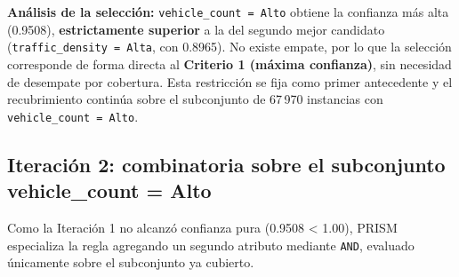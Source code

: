 \documentclass[12pt,a4paper]{article}
\begin{document}
\textbf{Análisis de la selección:} \texttt{vehicle\_count = Alto} obtiene
la confianza más alta (0.9508), \textbf{estrictamente superior} a la del
segundo mejor candidato (\texttt{traffic\_density = Alta}, con 0.8965).
No existe empate, por lo que la selección corresponde de forma directa al
\textbf{Criterio 1 (máxima confianza)}, sin necesidad de desempate por
cobertura. Esta restricción se fija como primer antecedente y el
recubrimiento continúa sobre el subconjunto de 67\,970 instancias con
\texttt{vehicle\_count = Alto}.

\subsection{Iteración 2: combinatoria sobre el subconjunto vehicle\_count = Alto}

Como la Iteración 1 no alcanzó confianza pura (0.9508 < 1.00), PRISM
especializa la regla agregando un segundo atributo mediante \texttt{AND},
evaluado únicamente sobre el subconjunto ya cubierto.

\begin{table}[H]
\centering
\caption{Iteración 2 -- vehicle\_count = Alto AND ... (clase Larga)}
\renewcommand{\arraystretch}{1.2}
\end{table}
\end{document}
